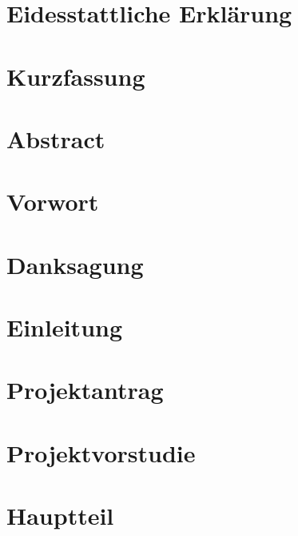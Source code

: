 \documentclass[12pt]{article}
\begin{document}


\section*{Eidesstattliche Erklärung}

\pagebreak

\section*{Kurzfassung}

\pagebreak

\section*{Abstract}

\pagebreak

\section*{Vorwort}

\pagebreak

\section*{Danksagung}

\pagebreak
{} 

\tableofcontents
\pagebreak

\section{Einleitung}

\pagebreak

\section{Projektantrag}

\pagebreak

\section{Projektvorstudie}

\pagebreak

\section{Hauptteil}

\pagebreak
\end{document}
